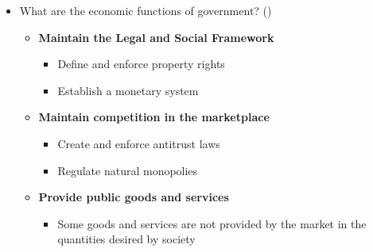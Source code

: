 \documentclass[
  ignorenonframetext,
  english,
]{beamer}
\providecommand{\tightlist}{%
  \setlength{\itemsep}{0pt}\setlength{\parskip}{0pt}}\usepackage{longtable,booktabs,array}
\begin{document}
\begin{frame}{}
\label{section-2}
\begin{itemize}
\item
  What are the economic functions of government?
  ()

  \begin{itemize}
  \item
    \textbf{Maintain the Legal and Social Framework}

    \begin{itemize}
    \tightlist
    \item
      Define and enforce property rights
    \item
      Establish a monetary system
    \end{itemize}
  \item
    \textbf{Maintain competition in the marketplace}

    \begin{itemize}
    \tightlist
    \item
      Create and enforce antitrust laws
    \item
      Regulate natural monopolies
    \end{itemize}
  \item
    \textbf{Provide public goods and services}

    \begin{itemize}
    \tightlist
    \item
      Some goods and services are not provided by the market in the
      quantities desired by society
    \end{itemize}
  \end{itemize}
\end{itemize}
\end{frame}
\end{document}
